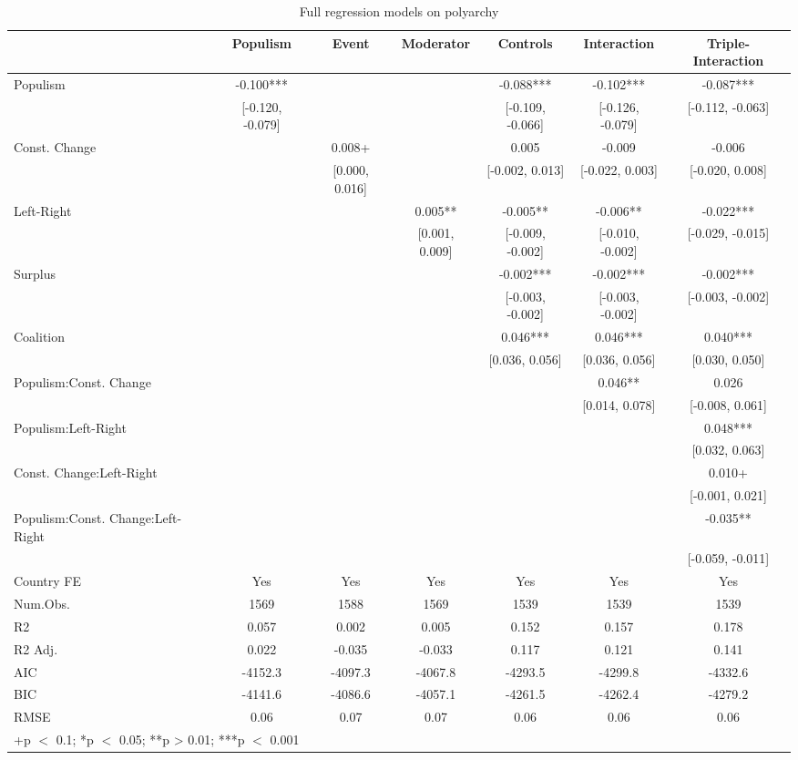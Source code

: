 \documentclass[
  abstract]{article}
\begin{document}
\renewcommand{\arraystretch}{0.5}
\setlength{\tabcolsep}{2pt}

\hypertarget{tbl-polyarchy}{}
\begin{table}
\caption{\label{tbl-polyarchy}Full regression models on polyarchy }\tabularnewline

\centering\centering\centering
\begin{tabular}[t]{lcccccc}
\toprule
  & Populism & Event & Moderator & Controls & Interaction & Triple-Interaction\\
\midrule
Populism & -0.100*** &  &  & -0.088*** & -0.102*** & -0.087***\\
 & {}[-0.120, -0.079] &  &  & {}[-0.109, -0.066] & {}[-0.126, -0.079] & {}[-0.112, -0.063]\\
Const. Change &  & 0.008+ &  & 0.005 & -0.009 & -0.006\\
 &  & {}[0.000, 0.016] &  & {}[-0.002, 0.013] & {}[-0.022, 0.003] & {}[-0.020, 0.008]\\
Left-Right &  &  & 0.005** & -0.005** & -0.006** & -0.022***\\
 &  &  & {}[0.001, 0.009] & {}[-0.009, -0.002] & {}[-0.010, -0.002] & {}[-0.029, -0.015]\\
Surplus &  &  &  & -0.002*** & -0.002*** & -0.002***\\
 &  &  &  & {}[-0.003, -0.002] & {}[-0.003, -0.002] & {}[-0.003, -0.002]\\
Coalition &  &  &  & 0.046*** & 0.046*** & 0.040***\\
 &  &  &  & {}[0.036, 0.056] & {}[0.036, 0.056] & {}[0.030, 0.050]\\
Populism:Const. Change &  &  &  &  & 0.046** & 0.026\\
 &  &  &  &  & {}[0.014, 0.078] & {}[-0.008, 0.061]\\
Populism:Left-Right &  &  &  &  &  & 0.048***\\
 &  &  &  &  &  & {}[0.032, 0.063]\\
Const. Change:Left-Right &  &  &  &  &  & 0.010+\\
 &  &  &  &  &  & {}[-0.001, 0.021]\\
Populism:Const. Change:Left-Right &  &  &  &  &  & -0.035**\\
 &  &  &  &  &  & {}[-0.059, -0.011]\\
\midrule
Country FE & Yes & Yes & Yes & Yes & Yes & Yes\\
Num.Obs. & 1569 & 1588 & 1569 & 1539 & 1539 & 1539\\
R2 & 0.057 & 0.002 & 0.005 & 0.152 & 0.157 & 0.178\\
R2 Adj. & 0.022 & -0.035 & -0.033 & 0.117 & 0.121 & 0.141\\
AIC & -4152.3 & -4097.3 & -4067.8 & -4293.5 & -4299.8 & -4332.6\\
BIC & -4141.6 & -4086.6 & -4057.1 & -4261.5 & -4262.4 & -4279.2\\
RMSE & 0.06 & 0.07 & 0.07 & 0.06 & 0.06 & 0.06\\
\bottomrule
\multicolumn{7}{l}{\rule{0pt}{1em}+p $<$ 0.1; *p $<$ 0.05; **p > 0.01; ***p $<$ 0.001}\\
\end{tabular}
\end{table}
\end{document}

